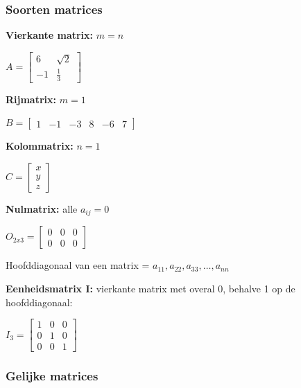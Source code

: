 \documentclass{article}
\begin{document}
\subsubsection{Soorten matrices}

\textbf{Vierkante matrix:} $m = n$

\begin{center}
    $A = \begin{bmatrix}
        6 & \sqrt{2}\\
        -1 & \frac13
    \end{bmatrix}$
\end{center}

\textbf{Rijmatrix:} $m = 1$

\begin{center}
    $B = \begin{bmatrix}
        1 & -1 & -3 & 8 & -6 & 7
    \end{bmatrix}$
\end{center}

\textbf{Kolommatrix:} $n = 1$

\begin{center}
    $C = \begin{bmatrix}
        x\\
        y\\
        z
    \end{bmatrix}$
\end{center}


\textbf{Nulmatrix:} alle $a_{ij} = 0$ 

\begin{center}
    $O_{2x3} = \begin{bmatrix}
        0 & 0 & 0\\
        0 & 0 & 0
    \end{bmatrix}$
\end{center}


Hoofddiagonaal van een matrix = $a_{11}, a_{22}, a_{33}, \dots, a_{nn}$

\textbf{Eenheidsmatrix I:} vierkante matrix met overal 0, behalve 1 op de hoofddiagonaal:

\begin{center}
    $I_3 = \begin{bmatrix}
        1 & 0 & 0\\
        0 & 1 & 0\\
        0 & 0 & 1
    \end{bmatrix}$
\end{center}

\subsubsection{Gelijke matrices}
\end{document}

